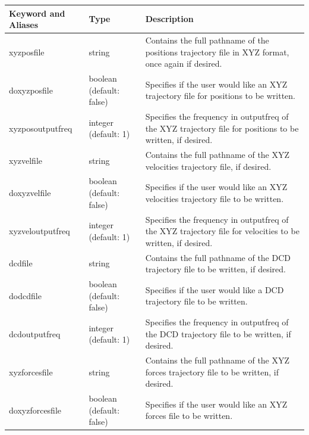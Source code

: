 \documentclass[11pt]{report}
\begin{document}
  \begin{tabular}{|p{5.5cm}|p{4cm}|p{6cm}|}\hline
    Keyword and Aliases & Type & Description   \\\hline\hline


    xyzposfile &
    string &
    Contains the full pathname of the positions trajectory file in XYZ format, once again if desired. \\\hline


    doxyzposfile &
    boolean (default: false) &
    Specifies if the user would like an XYZ trajectory file for positions to be written. \\\hline

    xyzposoutputfreq &
    integer (default: 1) &
    Specifies the frequency in outputfreq of the XYZ trajectory file for positions to be written, if desired.\\\hline


    xyzvelfile &
    string &
    Contains the full pathname of the XYZ velocities trajectory file, if desired.  \\\hline


    doxyzvelfile &
    boolean (default: false) &
    Specifies if the user would like an XYZ velocities trajectory file to be written. \\\hline


    xyzveloutputfreq &
    integer (default: 1) &
    Specifies the frequency in outputfreq of the XYZ trajectory file for velocities to be written, if desired.\\\hline

    dcdfile &
    string &
    Contains the full pathname of the DCD trajectory file to be written, if desired.  \\\hline


    dodcdfile &
    boolean (default: false) &
    Specifies if the user would like a DCD trajectory file to be written. \\\hline


    dcdoutputfreq &
    integer (default: 1) &
    Specifies the frequency in outputfreq of the DCD trajectory file to be written, if desired.\\\hline

    xyzforcesfile &
    string &
    Contains the full pathname of the XYZ forces trajectory file to be written, if desired. \\\hline


    doxyzforcesfile &
    boolean (default: false) &
    Specifies if the user would like an XYZ forces file to be written. \\\hline


\end{tabular}
\end{document}
